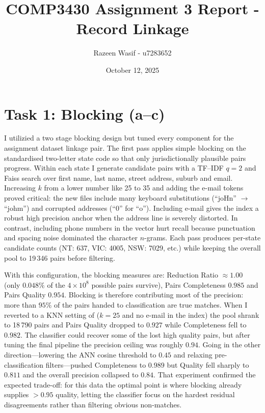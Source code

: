 \documentclass[11pt]{article}
\title{COMP3430 Assignment 3 Report - Record Linkage}
\author{Razeen Wasif - u7283652}
\date{October 12, 2025}
\begin{document}
\maketitle

\section*{Task 1: Blocking (a--c)}
I utilizied a two stage blocking design but tuned every component for the assignment dataset linkage pair. The first pass applies simple blocking on the standardised two-letter state code so that only jurisdictionally plausible pairs progress. Within each state I generate candidate pairs with a TF--IDF $q{=}2$ and Faiss search over first name, last name, street address, suburb and email. Increasing $k$ from a lower number like 25 to 35 and adding the e-mail tokens proved critical: the new files include many keyboard substitutions (``joHn'' $\rightarrow$ ``johm'') and corrupted addresses (``0'' for ``o''). Including e-mail gives the index a robust high precision anchor when the address line is severely distorted. In contrast, including phone numbers in the vector hurt recall because punctuation and spacing noise dominated the character $n$-grams. Each pass produces per-state candidate counts (NT: 637, VIC: 4005, NSW: 7029, etc.) while keeping the overall pool to 19\,346 pairs before filtering.

With this configuration, the blocking measures are: Reduction Ratio $\approx 1.00$ (only $0.048\%$ of the $4 \times 10^{8}$ possible pairs survive), Pairs Completeness $0.985$ and Pairs Quality $0.954$. Blocking is therefore contributing most of the precision: more than $95\%$ of the pairs handed to classification are true matches. When I reverted to a KNN setting of ($k{=}25$ and no e-mail in the index) the pool shrank to 18\,790 pairs and Pairs Quality dropped to $0.927$ while Completeness fell to $0.982$. The classifier could recover some of the lost high quality pairs, but after tuning the final pipeline the precision ceiling was roughly $0.94$. Going in the other direction---lowering the ANN cosine threshold to $0.45$ and relaxing pre-classification filters---pushed Completeness to $0.989$ but Quality fell sharply to $0.811$ and the overall precision collapsed to $0.84$. That experiment confirmed the expected trade-off: for this data the optimal point is where blocking already supplies $>0.95$ quality, letting the classifier focus on the hardest residual disagreements rather than filtering obvious non-matches.
\end{document}
